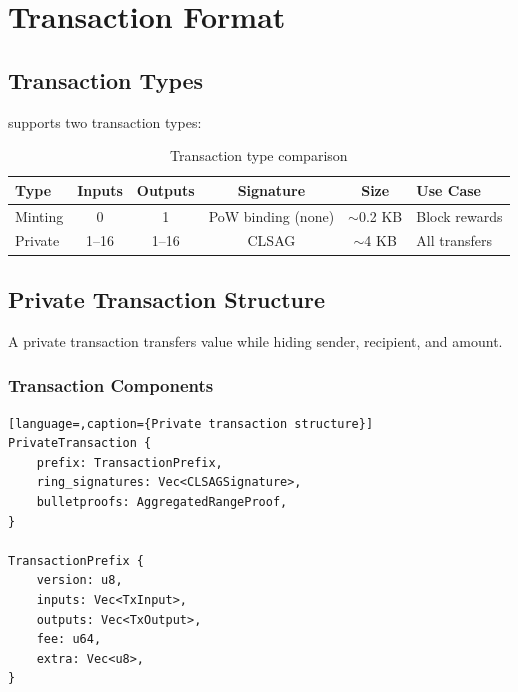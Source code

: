 
\section{Transaction Format}
\label{sec:transactions}

\subsection{Transaction Types}

\Botho supports two transaction types:

\begin{table}[h]
\centering
\caption{Transaction type comparison}
\label{tab:tx-types}
\begin{tabular}{@{}lccccl@{}}
\toprule
\textbf{Type} & \textbf{Inputs} & \textbf{Outputs} & \textbf{Signature} & \textbf{Size} & \textbf{Use Case} \\
\midrule
Minting & 0 & 1 & PoW binding (none) & $\sim$0.2 KB & Block rewards \\
Private & 1--16 & 1--16 & CLSAG & $\sim$4 KB & All transfers \\
\bottomrule
\end{tabular}
\end{table}

\subsection{Private Transaction Structure}

A private transaction transfers value while hiding sender, recipient,
and amount.



\subsubsection{Transaction Components}

\begin{lstlisting}[language=,caption={Private transaction structure}]
PrivateTransaction {
    prefix: TransactionPrefix,
    ring_signatures: Vec<CLSAGSignature>,
    bulletproofs: AggregatedRangeProof,
}

TransactionPrefix {
    version: u8,
    inputs: Vec<TxInput>,
    outputs: Vec<TxOutput>,
    fee: u64,
    extra: Vec<u8>,
}
\end{lstlisting}

